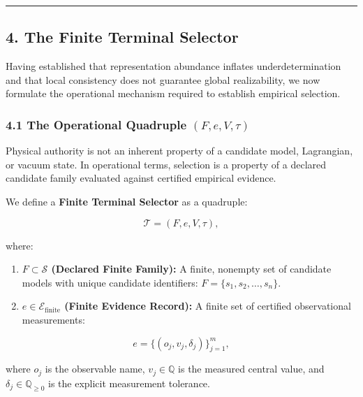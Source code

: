 \documentclass[
  10pt,
]{article}
\begin{document}
\begin{center}\rule{0.5\linewidth}{0.5pt}\end{center}

\subsection{4. The Finite Terminal Selector}\label{the-finite-terminal-selector}

Having established that representation abundance inflates underdetermination and that local consistency does not guarantee global realizability, we now formulate the operational mechanism required to establish empirical selection.

\subsubsection[4.1 The Operational Quadruple ]{\texorpdfstring{4.1 The Operational Quadruple \protect\hypertarget{math-E0004-0179}{}{\((F, e, V, \tau)\)}}{4.1 The Operational Quadruple (F, e, V, \textbackslash tau)}}\label{the-operational-quadruple-f-e-v-tau}

Physical authority is not an inherent property of a candidate model, Lagrangian, or vacuum state. In operational terms, selection is a property of a declared candidate family evaluated against certified empirical evidence.

We define a \textbf{Finite Terminal Selector} as a quadruple:

\hypertarget{math-E0135-0180}{}{\[\mathcal{T} = (F, e, V, \tau),\]}

where:

\begin{enumerate}
\def\labelenumi{\arabic{enumi}.}
\item
  \textbf{\hypertarget{math-E0036-0181}{}{\(F \subset \mathcal{S}\)} (Declared Finite Family):} A finite, nonempty set of candidate models with unique candidate identifiers: \hypertarget{math-E0136-0182}{}{\(F = \{s_1, s_2, \ldots, s_n\}\)}.
\item
  \textbf{\hypertarget{math-E0137-0183}{}{\(e \in \mathcal{E}_{\text{finite}}\)} (Finite Evidence Record):} A finite set of certified observational measurements:
\end{enumerate}

\hypertarget{math-E0138-0184}{}{\[e = \{(o_j, v_j, \delta_j)\}_{j=1}^m,\]}

where \hypertarget{math-E0139-0185}{}{\(o_j\)} is the observable name, \hypertarget{math-E0140-0186}{}{\(v_j \in \mathbb{Q}\)} is the measured central value, and \hypertarget{math-E0141-0187}{}{\(\delta_j \in \mathbb{Q}_{\ge 0}\)} is the explicit measurement tolerance.
\end{document}
